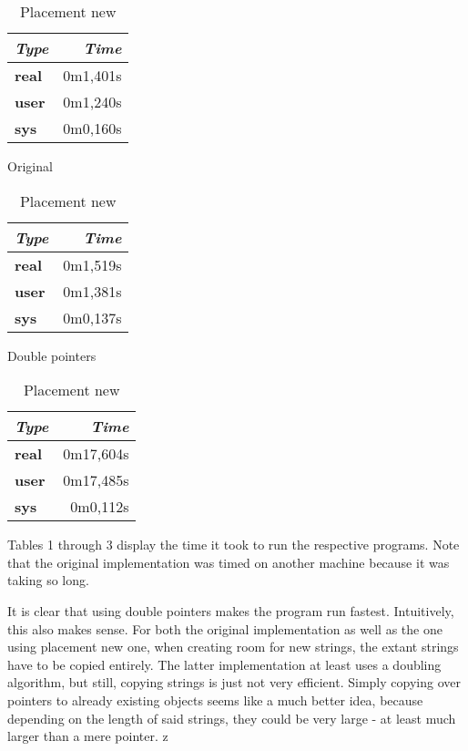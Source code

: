 \begin{table}[H]
\parbox{0.33\linewidth}
{
\centering
\begin{tabular}{l|r}
\textit{\textbf{Type}} & \textit{\textbf{Time}} \\ \hline
\textbf{real}          & 0m1,401s               \\
\textbf{user}          & 0m1,240s               \\
\textbf{sys}           & 0m0,160s               \\ \hline
\end{tabular}
\caption{Original}
}
\parbox{0.33\linewidth}
{
\centering
\begin{tabular}{l|r}
\textit{\textbf{Type}} & \textit{\textbf{Time}} \\ \hline
\textbf{real}          & 0m1,519s               \\
\textbf{user}          & 0m1,381s               \\
\textbf{sys}           & 0m0,137s               \\ \hline
\end{tabular}
\caption{Double pointers}
}
\parbox{0.33\linewidth}
{
\centering
\begin{tabular}{l|r}
\textit{\textbf{Type}} & \textit{\textbf{Time}} \\ \hline
\textbf{real}          & 0m17,604s              \\
\textbf{user}          & 0m17,485s              \\
\textbf{sys}           & 0m0,112s               \\ \hline
\end{tabular}
\caption{Placement new}
}
\end{table}

Tables 1 through 3 display the time it took to run the respective programs. Note that the original implementation was timed on another machine because it was taking so long.

It is clear that using double pointers makes the program run fastest. Intuitively, this also makes sense. For both the original implementation as well as the one using placement new one, when creating room for new strings, the extant strings have to be copied entirely. The latter implementation at least uses a doubling algorithm, but still, copying strings is just not very efficient. Simply copying over pointers to already existing objects seems like a much better idea, because depending on the length of said strings, they could be very large - at least much larger than a mere pointer.
z
